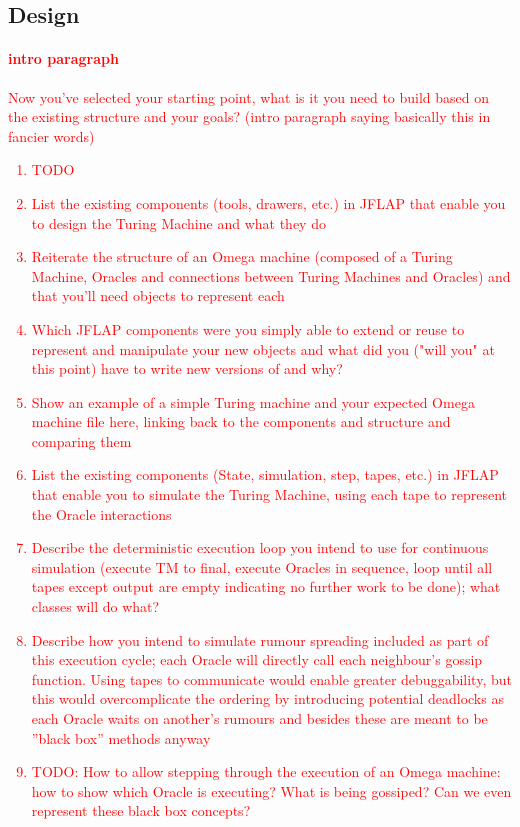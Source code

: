 \documentclass[12pt,a4,xcolor=table]{article}
\begin{document}
	\subsection{Design}
	\textcolor{red}{\paragraph{intro paragraph}
		Now you've selected your starting point, what is it you need to build based on the existing structure and your goals? (intro paragraph saying basically this in fancier words)
	}
	\textcolor{red}{
		\begin{enumerate}\item[]TODO
			\item List the existing components (tools, drawers, etc.) in JFLAP that enable you to design the Turing Machine and what they do
			\item Reiterate the structure of an Omega machine (composed of a Turing Machine, Oracles and connections between Turing Machines and Oracles) and that you'll need objects to represent each
			\item Which JFLAP components were you simply able to extend or reuse to represent and manipulate your new objects and what did you ("will you" at this point) have to write new versions of and why?
			\item Show an example of a simple Turing machine and your expected Omega machine file here, linking back to the components and structure and comparing them
			\item List the existing components (State, simulation, step, tapes, etc.) in JFLAP that enable you to simulate the Turing Machine, using each tape to represent the Oracle interactions
			\item Describe the deterministic execution loop you intend to use for continuous simulation (execute TM to final, execute Oracles in sequence, loop until all tapes except output are empty indicating no further work to be done); what classes will do what?
			\item Describe how you intend to simulate rumour spreading included as part of this execution cycle; each Oracle will directly call each neighbour's gossip function. Using tapes to communicate would enable greater debuggability, but this would overcomplicate the ordering by introducing potential deadlocks as each Oracle waits on another's rumours and besides these are meant to be ''black box'' methods anyway
			\item TODO: How to allow stepping through the execution of an Omega machine: how to show which Oracle is executing? What is being gossiped? Can we even represent these black box concepts?
		\end{enumerate}
	}
\end{document}
